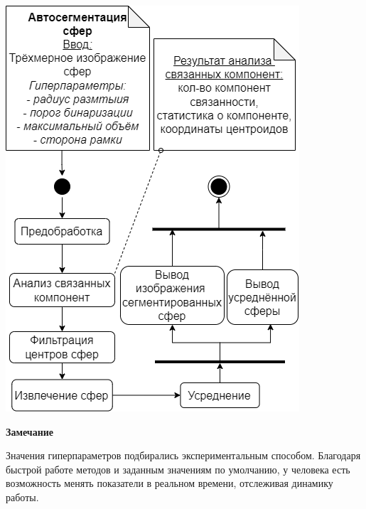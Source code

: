 \begin{minipage}{\textwidth}
	\centering
	\vspace{\mfloatsep} %
	\includegraphics[keepaspectratio=true,scale=0.4] {my_folder/images/autosegm/schema.png}
	\label{fig:autosegm-schema}  
	\vspace{\mfloatsep} %
\end{minipage}
\textbf{Замечание}
\par Значения гиперпараметров подбирались экспериментальным  способом. Благодаря быстрой работе методов и заданным значениям по умолчанию, у человека есть возможность менять показатели в реальном времени, отслеживая динамику работы.

